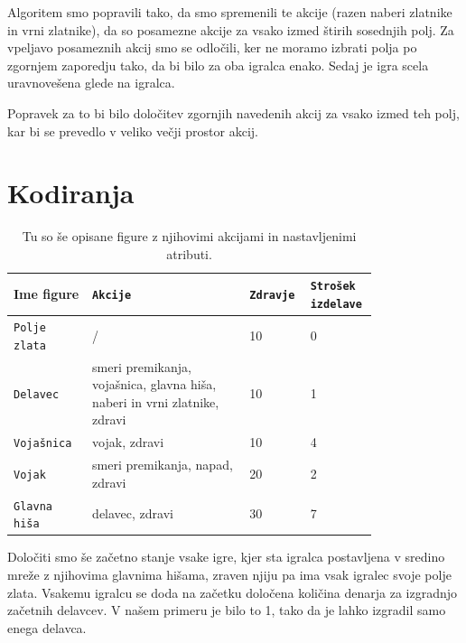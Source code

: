 \documentclass[a4paper, 12pt]{book}
\begin{document}
Algoritem smo popravili tako, da smo spremenili te akcije (razen naberi zlatnike in vrni zlatnike), da so posamezne akcije za vsako izmed štirih sosednjih polj.
Za vpeljavo posameznih akcij smo se odločili, ker ne moramo izbrati polja po zgornjem zaporedju tako, da bi bilo za oba igralca enako.
Sedaj je igra scela uravnovešena glede na igralca.

Popravek za to bi bilo določitev zgornjih navedenih akcij za vsako izmed teh polj, kar bi se prevedlo v veliko večji prostor akcij.

\section{Kodiranja}

\begin{table}

	\begin{center}
		
	\begin{tabular}{p{0.2\linewidth}|p{0.4\linewidth}|p{0.1\linewidth}|p{0.1\linewidth}}
		Ime figure          & {\tt Akcije}                                                              & {\tt Zdravje} & {\tt Strošek izdelave} \\ \hline
		{\tt Polje zlata}   & /                                                                         & 10            & 0 \\
		{\tt Delavec}       & smeri premikanja, vojašnica, glavna hiša, naberi in vrni zlatnike, zdravi & 10            & 1 \\
		{\tt Vojašnica}     & vojak, zdravi                                                             & 10            & 4 \\
		{\tt Vojak}         & smeri premikanja, napad, zdravi                                           & 20            & 2 \\
		{\tt Glavna hiša}   & delavec, zdravi                                                           & 30            & 7 \\
	\end{tabular}
	\end{center}
	\caption{Tu so še opisane figure z njihovimi akcijami in nastavljenimi atributi.}
	\label{tabelfigures}
\end{table}

Določiti smo še začetno stanje vsake igre, kjer sta igralca postavljena v sredino mreže z njihovima glavnima hišama, zraven njiju pa ima vsak igralec svoje polje zlata. 
Vsakemu igralcu se doda na začetku določena količina denarja za izgradnjo začetnih delavcev. V našem primeru je bilo to 1, tako da je lahko izgradil samo enega delavca.
\end{document}
